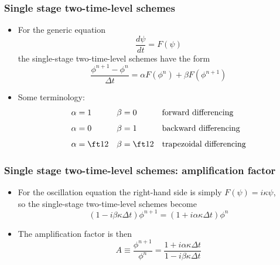\documentclass[aspectratio=149,9pt]{beamer}
\begin{document}
%
%
\begin{frame}
	\frametitle{Single stage two-time-level schemes}
	\begin{itemize}
		\item For the generic equation
			\begin{equation*}
				\frac{d \psi}{dt} = F ( \psi)
			\end{equation*}
			the single-stage two-time-level schemes have the form
			\begin{equation*}
				\frac{\phi^{n+1} - \phi^n}{\Delta t} = \alpha F(\phi^n) + \beta F(\phi^{n+1})
			\end{equation*}
	\pause
		\item Some terminology:
			\begin{align*}
				\alpha &=1 & \beta &=0 && \text{forward differencing} \\[1ex]
				\alpha &=0 & \beta &=1 && \text{backward differencing} \\[1ex]
				\alpha &= \ft12 & \beta &= \ft12 && \text{trapezoidal differencing}
			\end{align*}
	\end{itemize}
\end{frame}
%
%
%
\begin{frame}
	\frametitle{Single stage two-time-level schemes: amplification factor}
	\begin{itemize}
		\item For the oscillation equation the right-hand side is simply $F(\psi)=i\kappa\psi$,\\ so the single-stage two-time-level schemes become
			\begin{equation*}
				\left(1 - i \beta \kappa \Delta t\right) \phi^{n+1} = \left( 1 + i \alpha \kappa \Delta t \right) \phi^n
			\end{equation*}
		\item The amplification factor is then
			\begin{equation*}
				A \equiv \frac{\phi^{n+1}}{\phi^{n}} = \frac{1 + i \alpha \kappa \Delta t}{1 - i \beta \kappa \Delta t}
			\end{equation*}
	\end{itemize}
\end{frame}
%
%
%
\end{document}
